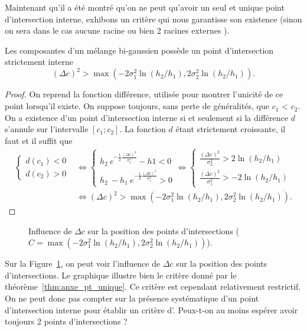 \documentclass[main.tex]{subfiles}
\begin{document}
Maintenant qu'il a été montré qu'on ne peut qu'avoir un seul et unique point d'intersection interne, exhibons un critère qui nous garantisse son existence (sinon on sera dans le cas aucune racine ou bien 2 racines externes ).
\begin{thm}
Les composantes d'un mélange bi-gaussien possède un point d'intersection  strictement interne \ssi
$$(\Delta c)^2 > \max \left( -2\sigma_1^2 \ln(h_2/h_1) , 2\sigma_2^2 \ln(h_2/h_1) \right). $$
\end{thm}
\begin{proof}
On reprend la fonction différence, utilisée pour montrer l'unicité de ce point lorsqu'il existe. On suppose toujours, sans perte de généralités, que $c_1$ < $c_2$. On a existence d'un point d'intersection interne si et seulement si la différence $d$ s'annule sur l'intervalle $[c_1;c_2]$. La fonction $d$ étant strictement croissante, il faut et il suffit que
\begin{equation*}
\begin{aligned}
\left\{
\begin{aligned}
d(c_1)<0 \\ d(c_2)>0 
\end{aligned}
\right. &\Longleftrightarrow \left\{
\begin{aligned}
h_2 \ e^{ -\frac{1}{2} \frac{(\Delta c)^2}{\sigma_2^2} } -h1 <0 \\ 
h_2 \  - h_1\ e^{ -\frac{1}{2} \frac{(\Delta c)^2}{\sigma_1^2} }>0 
\end{aligned}
\right. \Longleftrightarrow \left\{
\begin{aligned}
\frac{(\Delta c)^2}{\sigma_2^2} > 2 \ln(  h_2  / h_1  ) \\ 
\frac{(\Delta c)^2}{\sigma_1^2} > -2 \ln( h_2 / h_1 )
\end{aligned}
\right. \\
&\Longleftrightarrow (\Delta c)^2 > \max \left( -2\sigma_1^2 \ln(h_2/h_1) , 2\sigma_2^2 \ln(h_2/h_1) \right).
\end{aligned}
\end{equation*}
\end{proof}
\begin{figure}
\caption{\label{fig:influence_dc} Influence de $\Delta c$ sur la position des points d'intersections (\mbox{$C=\max \left( -2\sigma_1^2 \ln(h_2/h_1) , 2\sigma_2^2 \ln(h_2/h_1) \right)$}).}
\end{figure}
Sur la Figure~\ref{fig:influence_dc}, on peut voir l'influence de $\Delta c$ sur la position des points d'intersections. Le graphique illustre bien le critère donné par le théorème~\ref{thm:anxe_pt_unique}. Ce critère est cependant relativement restrictif. On ne peut donc pas compter sur la présence systématique d'un point d'intersection interne pour établir un critère d'\hetero. Peux-t-on au moins espérer avoir toujours 2 points d'intersections ?
\end{document}

